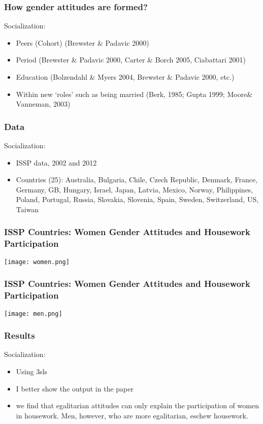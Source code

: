 \documentclass{beamer}
\begin{document}
\begin{frame}
\frametitle{How gender attitudes are formed?}

Socialization:
\begin{itemize}
\item Peers (Cohort) (Brewster \& Padavic 2000)
\item Period (Brewster \& Padavic 2000, Carter \& Borch 2005, Ciabattari 2001)
\item Education (Bolzendahl \& Myers 2004, Brewster \& Padavic 2000, etc.)
\item Within new ‘roles’ such as being married (Berk, 1985; Gupta 1999; Moore\& Vanneman, 2003)

\end{itemize}

\end{frame}

\begin{frame}
\frametitle{Data}

Socialization:
\begin{itemize}
\item ISSP data, 2002 and 2012
\item Countries (25): Australia, Bulgaria, Chile, Czech Republic, Denmark, France, Germany, GB, Hungary, Israel, Japan, Latvia, Mexico, Norway, Philippines, Poland, Portugal, Russia, Slovakia, Slovenia, Spain, Sweden, Switzerland, US, Taiwan

\end{itemize}

\end{frame}

\begin{frame}
\frametitle{ISSP Countries: Women Gender Attitudes and Housework Participation}
  \texttt{[image: women.png]}
\end{frame}

\begin{frame}
\frametitle{ISSP Countries: Women Gender Attitudes and Housework Participation}
  \texttt{[image: men.png]}
\end{frame}

\begin{frame}
\frametitle{Results}

Socialization:
\begin{itemize}
\item Using 3sls
\item I better show the output in the paper
\item we find that egalitarian attitudes can only explain the participation of women in housework. Men, however, who are more egalitarian, eschew housework. 

\end{itemize}

\end{frame}
\end{document}
